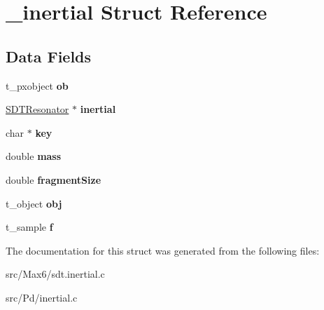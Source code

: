 \hypertarget{struct__inertial}{}\section{\+\_\+inertial Struct Reference}
\label{struct__inertial}
\subsection*{Data Fields}
\begin{DoxyCompactItemize}
\item 
\hypertarget{struct__inertial_a55b4380edb216f04a1c42b9095594963}{}t\+\_\+pxobject {\bfseries ob}\label{struct__inertial_a55b4380edb216f04a1c42b9095594963}

\item 
\hypertarget{struct__inertial_a787d61bea6b57ad477b89f7a32720c4b}{}\hyperlink{struct_s_d_t_resonator}{S\+D\+T\+Resonator} $\ast$ {\bfseries inertial}\label{struct__inertial_a787d61bea6b57ad477b89f7a32720c4b}

\item 
\hypertarget{struct__inertial_a300a5cc1ad956ba66d9082e9e1945142}{}char $\ast$ {\bfseries key}\label{struct__inertial_a300a5cc1ad956ba66d9082e9e1945142}

\item 
\hypertarget{struct__inertial_a244bf42c46054cf1113be44d55f2156d}{}double {\bfseries mass}\label{struct__inertial_a244bf42c46054cf1113be44d55f2156d}

\item 
\hypertarget{struct__inertial_a9d63554896a3857fbd74343d213f2351}{}double {\bfseries fragment\+Size}\label{struct__inertial_a9d63554896a3857fbd74343d213f2351}

\item 
\hypertarget{struct__inertial_a21775ab6bc98b0961a6e9fd9d832e65b}{}t\+\_\+object {\bfseries obj}\label{struct__inertial_a21775ab6bc98b0961a6e9fd9d832e65b}

\item 
\hypertarget{struct__inertial_a3b27de018058e7941a2f36d7a28c2cda}{}t\+\_\+sample {\bfseries f}\label{struct__inertial_a3b27de018058e7941a2f36d7a28c2cda}

\end{DoxyCompactItemize}


The documentation for this struct was generated from the following files\+:\begin{DoxyCompactItemize}
\item 
src/\+Max6/sdt.\+inertial.\+c\item 
src/\+Pd/inertial.\+c\end{DoxyCompactItemize}
